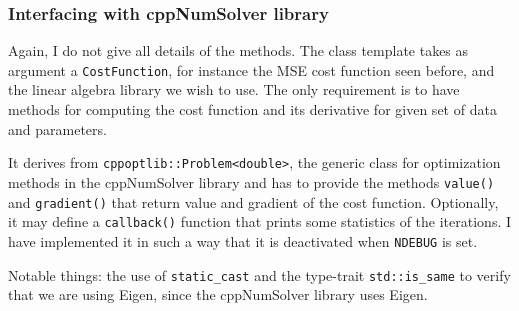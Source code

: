 \documentclass{article}
\newcommand{\li}{\lstinline}
\begin{document}
\subsubsection{Interfacing with cppNumSolver library}
Again, I do not give all details of the methods. The class template takes as argument a \li!CostFunction!, for instance the MSE cost function seen before, and the linear algebra library we wish to use.
The only requirement is to have methods for computing the cost function
and its derivative for given set of data and parameters.

It derives from \li!cppoptlib::Problem<double>!, the generic
class for optimization methods in the cppNumSolver library and has to
provide the methods \li!value()! and \li!gradient()! that return
value and gradient of the cost function. Optionally, it may define
a \li!callback()! function that prints some statistics of the
iterations. I have implemented it in such a way that it is  deactivated when \li!NDEBUG! is set.

Notable things: the use of \li!static_cast! and the type-trait
\li!std::is_same! to verify
that we are using Eigen, since the cppNumSolver library uses Eigen.
\end{document}
